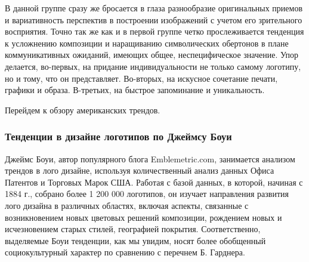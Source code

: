 В данной группе сразу же бросается в глаза разнообразие оригинальных приемов и вариативность
перспектив в построении изображений с учетом его зрительного восприятия. Точно так же как и в первой
группе четко прослеживается тенденция к усложнению композиции и наращиванию символических обертонов
в плане коммуникативных ожиданий, имеющих общее, неспецифическое значение. Упор делается, во-первых,
на придание индивидуальности не только самому логотипу, но и тому, что он представляет. Во-вторых,
на искусное сочетание печати, графики и образа. В-третьих, на быстрое запоминание и уникальность.

Перейдем к обзору американских трендов.

\subsubsection{Тенденции в дизайне логотипов по Джеймсу Боуи}

Джеймс Боуи, автор популярного блога Emblemetric.com, занимается анализом трендов в лого дизайне,
используя  количественный анализ данных Офиса Патентов и Торговых Марок США. Работая с базой данных,
в которой,  начиная с 1884 г., собрано более 1 200 000 логотипов, он изучает  направления развития
лого дизайна в различных областях, включая аспекты, связанные с возникновением новых цветовых
решений композиции, рождением новых и исчезновением старых стилей, географией
покрытия. Соответственно, выделяемые Боуи тенденции, как мы увидим, носят более обобщенный
социокультурный характер по сравнению с перечнем Б. Гарднера.


